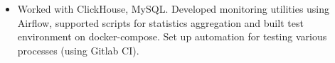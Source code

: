 \begin{itemize}
    \item Worked with ClickHouse, MySQL. Developed monitoring utilities using Airflow, supported scripts for statistics aggregation and built test environment on docker-compose. Set up automation for testing various processes (using Gitlab CI).
\end{itemize}
